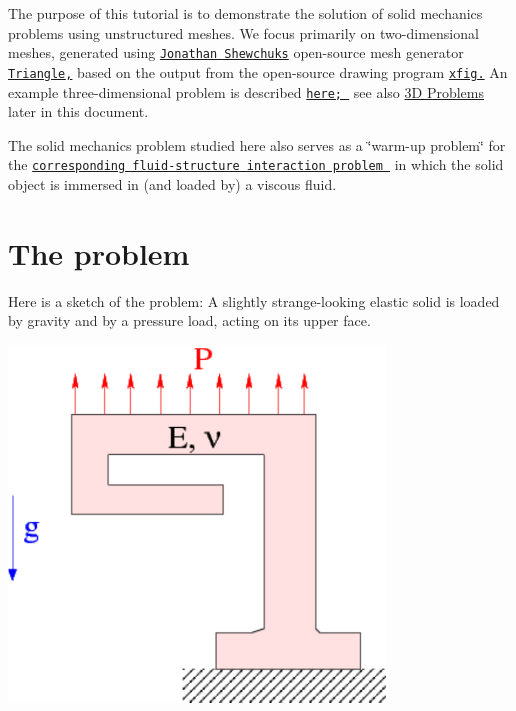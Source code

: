 The purpose of this tutorial is to demonstrate the solution of solid mechanics problems using unstructured meshes. We focus primarily on two-\/dimensional meshes, generated using \href{http://www.cs.berkeley.edu/~jrs/}{\tt Jonathan Shewchuk\textquotesingle{}s} open-\/source mesh generator \href{http://www.cs.cmu.edu/~quake/triangle.html}{\tt {\ttfamily Triangle},} based on the output from the open-\/source drawing program \href{http://en.wikipedia.org/wiki/Xfig}{\tt xfig.} An example three-\/dimensional problem is described \href{../../unstructured_three_d_solid/html/index.html}{\tt here; } see also \hyperlink{index_three_d}{3D Problems} later in this document.

The solid mechanics problem studied here also serves as a \char`\"{}warm-\/up problem\char`\"{} for the \href{../../../interaction/unstructured_fsi/html/index.html}{\tt corresponding fluid-\/structure interaction problem } in which the solid object is immersed in (and loaded by) a viscous fluid.



 

\hypertarget{index_problem}{}\section{The problem}\label{index_problem}
Here is a sketch of the problem\+: A slightly strange-\/looking elastic solid is loaded by gravity and by a pressure load, acting on its upper face.

 
\begin{DoxyImage}
\includegraphics[width=0.75\textwidth]{solid_sketch}
\end{DoxyImage}





